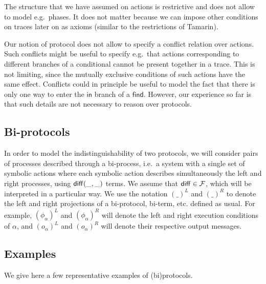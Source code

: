 \begin{remark}
  The structure that we have assumed on actions is restrictive and
  does not allow to model e.g.\ phases. It does not matter because we can
  impose other conditions on traces later on as axioms (similar to the
  restrictions of Tamarin). 
\end{remark}

\begin{remark}
  Our notion of protocol does not allow to specify a conflict relation
  over actions. Such conflicts might be useful to specify e.g.\ that
  actions corresponding to different branches of a conditional cannot
  be present together in a trace. This is not limiting, since the
  mutually exclusive conditions of such actions have the same effect.
  Conflicts could in principle be useful to model the fact that there is only
  one way to enter the $\mathsf{in}$ branch of a $\mathsf{find}$. However,
  our experience so far is that such details are not necessary to reason
  over protocols. 
\end{remark}

\subsection{Bi-protocols}

In order to model the indistinguishability of two protocols, we will
consider pairs of processes described through a bi-process, i.e.\ a system with
a single set of symbolic actions where each symbolic action describes
simultaneously the left and right processes, using $\mathsf{diff}(\_,\_)$ terms.
We assume that $\mathsf{diff} \in \mathcal{F}$,
which will be interpreted in a particular way. 
We use the notation $(\_)^L$ and $(\_)^R$ to denote the left and right
projections of a bi-protocol, bi-term, etc. defined as usual.
For example, $(\phi_{\alpha})^L$ and $(\phi_{\alpha})^R$ will denote
the left and right execution conditions of $\alpha$, and
$(o_{\alpha})^L$ and $(o_{\alpha})^R$ will denote their respective
output messages.

\subsection{Examples}

We give here a few representative examples of (bi)protocols.


